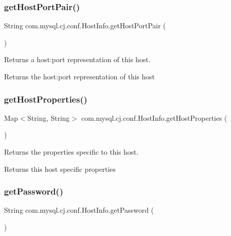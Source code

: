 \subsubsection{\texorpdfstring{get\+Host\+Port\+Pair()}{getHostPortPair()}}
{\footnotesize\ttfamily String com.\+mysql.\+cj.\+conf.\+Host\+Info.\+get\+Host\+Port\+Pair (\begin{DoxyParamCaption}{ }\end{DoxyParamCaption})}

Returns a host\+:port representation of this host.

\begin{DoxyReturn}{Returns}
the host\+:port representation of this host 
\end{DoxyReturn}
\mbox{\label{classcom_1_1mysql_1_1cj_1_1conf_1_1_host_info_aac017e83698627d6cf91a8eb3b1f263b}} 
\subsubsection{\texorpdfstring{get\+Host\+Properties()}{getHostProperties()}}
{\footnotesize\ttfamily Map$<$String, String$>$ com.\+mysql.\+cj.\+conf.\+Host\+Info.\+get\+Host\+Properties (\begin{DoxyParamCaption}{ }\end{DoxyParamCaption})}

Returns the properties specific to this host.

\begin{DoxyReturn}{Returns}
this host specific properties 
\end{DoxyReturn}
\mbox{\label{classcom_1_1mysql_1_1cj_1_1conf_1_1_host_info_aebe3979385ac27249cae703ec4c5ea6c}} 
\subsubsection{\texorpdfstring{get\+Password()}{getPassword()}}
{\footnotesize\ttfamily String com.\+mysql.\+cj.\+conf.\+Host\+Info.\+get\+Password (\begin{DoxyParamCaption}{ }\end{DoxyParamCaption})}

